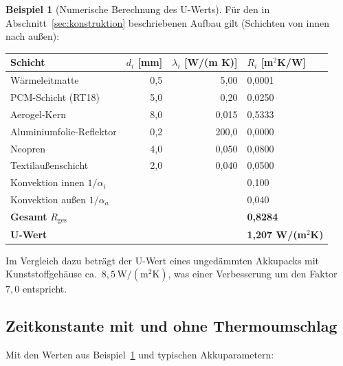 ﻿\documentclass[a4paper,12pt]{article}
\theoremstyle{definition}
\newtheorem{beispiel}{Beispiel}
\begin{document}
\begin{beispiel}[Numerische Berechnung des U-Werts]
\label{bsp:ugesamt}
F\"ur den in Abschnitt~\ref{sec:konstruktion} beschriebenen Aufbau gilt (Schichten von innen nach au\ss{}en):
\begin{center}
\begin{tabular}{lrrl}
\toprule
Schicht & $d_i$ [mm] & $\lambda_i$ [W/(m K)] & $R_i$ [m$^2$K/W] \\
\midrule
W\"armeleitmatte         & 0{,}5 & 5{,}00 & 0{,}0001 \\
PCM-Schicht (RT18)      & 5{,}0 & 0{,}20 & 0{,}0250 \\
Aerogel-Kern            & 8{,}0 & 0{,}015 & 0{,}5333 \\
Aluminiumfolie-Reflektor & 0{,}2 & 200{,}0 & 0{,}0000 \\
Neopren                 & 4{,}0 & 0{,}050 & 0{,}0800 \\
Textilau\ss{}enschicht  & 2{,}0 & 0{,}040 & 0{,}0500 \\
\midrule
\multicolumn{3}{l}{Konvektion innen $1/\alpha_i$} & 0{,}100 \\
\multicolumn{3}{l}{Konvektion au\ss{}en $1/\alpha_a$} & 0{,}040 \\
\midrule
\multicolumn{3}{l}{\textbf{Gesamt} $R_\mathrm{ges}$} & \textbf{0{,}8284} \\
\midrule
\multicolumn{3}{l}{\textbf{U-Wert}} & \textbf{1{,}207 W/(m$^2$K)} \\
\bottomrule
\end{tabular}
\end{center}

Im Vergleich dazu betr\"agt der U-Wert eines unged\"ammten Akkupacks mit Kunststoffgeh\"ause ca.\ $8{,}5\,\mathrm{W/(m^2 K)}$, was einer Verbesserung um den Faktor $7{,}0$ entspricht.
\end{beispiel}

\subsection{Zeitkonstante mit und ohne Thermoumschlag}

Mit den Werten aus Beispiel~\ref{bsp:ugesamt} und typischen Akkuparametern:
\end{document}
